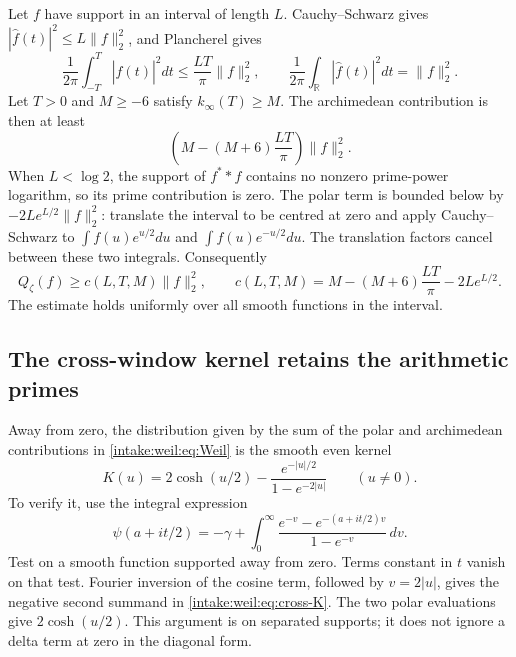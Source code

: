 Let $f$ have support in an interval of length $L$. Cauchy--Schwarz gives $|\widehat f(t)|^2\le L\|f\|_2^2$, and Plancherel gives
\[
 \frac1{2\pi}\int_{-T}^T|\widehat f(t)|^2dt
       \le\frac{LT}{\pi}\|f\|_2^2,\qquad
 \frac1{2\pi}\int_\mathbb R|\widehat f(t)|^2dt=\|f\|_2^2.
\]
Let $T>0$ and $M\ge-6$ satisfy $k_\infty(T)\ge M$.
The archimedean contribution is then at least
\[
 \left(M-(M+6)\frac{LT}{\pi}\right)\|f\|_2^2.
\]
When $L<\log2$, the support of $f^**f$ contains no nonzero prime-power logarithm, so its prime contribution is zero. The polar term is bounded below by $-2Le^{L/2}\|f\|_2^2$: translate the interval to be centred at zero and apply Cauchy--Schwarz to $\int f(u)e^{u/2}du$ and $\int f(u)e^{-u/2}du$. The translation factors cancel between these two integrals. Consequently
\begin{equation}\label{intake:weil:eq:local-coercivity}
 Q_\zeta(f)\ge c(L,T,M)\|f\|_2^2,
 \qquad c(L,T,M)=M-(M+6)\frac{LT}{\pi}-2Le^{L/2}.
\end{equation}
The estimate holds uniformly over all smooth functions in the interval.

\subsection{The cross-window kernel retains the arithmetic primes}
Away from zero, the distribution given by the sum of the polar and archimedean contributions in \eqref{intake:weil:eq:Weil} is the smooth even kernel
\begin{equation}\label{intake:weil:eq:cross-K}
 K(u)=2\cosh(u/2)-\frac{e^{-|u|/2}}{1-e^{-2|u|}}\qquad(u\ne0).
\end{equation}
To verify it, use the integral expression
\[
 \psi(a+it/2)=-\gamma+
 \int_0^\infty\frac{e^{-v}-e^{-(a+it/2)v}}{1-e^{-v}}\,dv.
\]
Test on a smooth function supported away from zero. Terms constant in $t$ vanish on that test. Fourier inversion of the cosine term, followed by $v=2|u|$, gives the negative second summand in \eqref{intake:weil:eq:cross-K}. The two polar evaluations give $2\cosh(u/2)$. This argument is on separated supports; it does not ignore a delta term at zero in the diagonal form.

